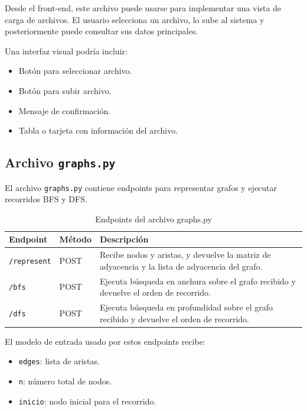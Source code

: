\documentclass[12pt]{article}
\begin{document}
Desde el front-end, este archivo puede usarse para implementar una vista de carga de archivos. El usuario selecciona un archivo, lo sube al sistema y posteriormente puede consultar sus datos principales.

Una interfaz visual podría incluir:

\begin{itemize}
	\item Botón para seleccionar archivo.
	\item Botón para subir archivo.
	\item Mensaje de confirmación.
	\item Tabla o tarjeta con información del archivo.
\end{itemize}

\subsection{Archivo \texttt{graphs.py}}

El archivo \texttt{graphs.py} contiene endpoints para representar grafos y ejecutar recorridos BFS y DFS.

\begin{table}[H]
	\centering
	\begin{tabular}{|p{4cm}|p{4cm}|p{6cm}|}
		\hline
		\textbf{Endpoint} & \textbf{Método} & \textbf{Descripción} \\
		\hline
		\texttt{/represent} & POST & Recibe nodos y aristas, y devuelve la matriz de adyacencia y la lista de adyacencia del grafo. \\
		\hline
		\texttt{/bfs} & POST & Ejecuta búsqueda en anchura sobre el grafo recibido y devuelve el orden de recorrido. \\
		\hline
		\texttt{/dfs} & POST & Ejecuta búsqueda en profundidad sobre el grafo recibido y devuelve el orden de recorrido. \\
		\hline
	\end{tabular}
	\caption{Endpoints del archivo graphs.py}
\end{table}

El modelo de entrada usado por estos endpoints recibe:

\begin{itemize}
	\item \texttt{edges}: lista de aristas.
	\item \texttt{n}: número total de nodos.
	\item \texttt{inicio}: nodo inicial para el recorrido.
\end{itemize}
\end{document}
